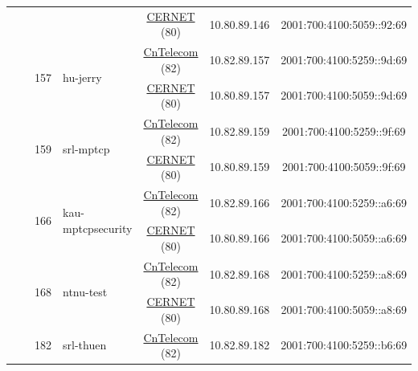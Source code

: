 \begin{small}
\begin{center}
\begin{longtable}{|c|c|c|c|c|c|c|c|}
  &  &  &  & \multicolumn{2}{|c|}{\tiny{\href{http://www.cernet.edu.cn}{CERNET} (80)}} & \tiny{10.80.89.146} & \tiny{2001:700:4100:5059::92:69} \\* \cline{3-3}\cline{4-4}\cline{5-5}\cline{6-6}\cline{7-7}\cline{8-8}
  &  & \multirow{2}{*}{\tiny{157}} & \multicolumn{1}{|l|}{\multirow{2}{*}{\tiny{hu-jerry}}} & \multicolumn{2}{|c|}{\tiny{\href{http://www.chinatelecom.com.cn}{CnTelecom} (82)}} & \tiny{10.82.89.157} & \tiny{2001:700:4100:5259::9d:69} \\* \cline{5-5}\cline{6-6}\cline{7-7}\cline{8-8}
  &  &  &  & \multicolumn{2}{|c|}{\tiny{\href{http://www.cernet.edu.cn}{CERNET} (80)}} & \tiny{10.80.89.157} & \tiny{2001:700:4100:5059::9d:69} \\* \cline{3-3}\cline{4-4}\cline{5-5}\cline{6-6}\cline{7-7}\cline{8-8}
  &  & \multirow{2}{*}{\tiny{159}} & \multicolumn{1}{|l|}{\multirow{2}{*}{\tiny{srl-mptcp}}} & \multicolumn{2}{|c|}{\tiny{\href{http://www.chinatelecom.com.cn}{CnTelecom} (82)}} & \tiny{10.82.89.159} & \tiny{2001:700:4100:5259::9f:69} \\* \cline{5-5}\cline{6-6}\cline{7-7}\cline{8-8}
  &  &  &  & \multicolumn{2}{|c|}{\tiny{\href{http://www.cernet.edu.cn}{CERNET} (80)}} & \tiny{10.80.89.159} & \tiny{2001:700:4100:5059::9f:69} \\* \cline{3-3}\cline{4-4}\cline{5-5}\cline{6-6}\cline{7-7}\cline{8-8}
  &  & \multirow{2}{*}{\tiny{166}} & \multicolumn{1}{|l|}{\multirow{2}{*}{\tiny{kau-mptcpsecurity}}} & \multicolumn{2}{|c|}{\tiny{\href{http://www.chinatelecom.com.cn}{CnTelecom} (82)}} & \tiny{10.82.89.166} & \tiny{2001:700:4100:5259::a6:69} \\* \cline{5-5}\cline{6-6}\cline{7-7}\cline{8-8}
  &  &  &  & \multicolumn{2}{|c|}{\tiny{\href{http://www.cernet.edu.cn}{CERNET} (80)}} & \tiny{10.80.89.166} & \tiny{2001:700:4100:5059::a6:69} \\* \cline{3-3}\cline{4-4}\cline{5-5}\cline{6-6}\cline{7-7}\cline{8-8}
  &  & \multirow{2}{*}{\tiny{168}} & \multicolumn{1}{|l|}{\multirow{2}{*}{\tiny{ntnu-test}}} & \multicolumn{2}{|c|}{\tiny{\href{http://www.chinatelecom.com.cn}{CnTelecom} (82)}} & \tiny{10.82.89.168} & \tiny{2001:700:4100:5259::a8:69} \\* \cline{5-5}\cline{6-6}\cline{7-7}\cline{8-8}
  &  &  &  & \multicolumn{2}{|c|}{\tiny{\href{http://www.cernet.edu.cn}{CERNET} (80)}} & \tiny{10.80.89.168} & \tiny{2001:700:4100:5059::a8:69} \\* \cline{3-3}\cline{4-4}\cline{5-5}\cline{6-6}\cline{7-7}\cline{8-8}
  &  & \multirow{2}{*}{\tiny{182}} & \multicolumn{1}{|l|}{\multirow{2}{*}{\tiny{srl-thuen}}} & \multicolumn{2}{|c|}{\tiny{\href{http://www.chinatelecom.com.cn}{CnTelecom} (82)}} & \tiny{10.82.89.182} & \tiny{2001:700:4100:5259::b6:69} \\* \cline{5-5}\cline{6-6}\cline{7-7}\cline{8-8}

\end{longtable}
\end{center}
\end{small}
